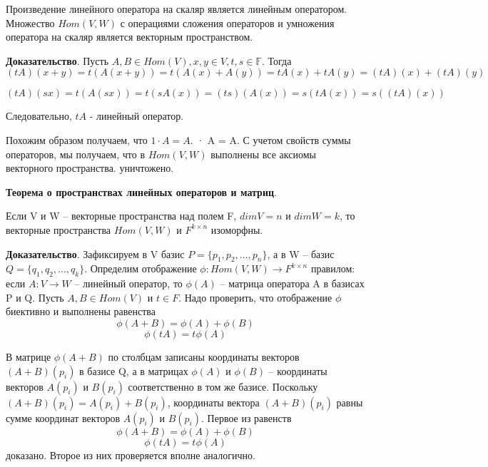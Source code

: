 \documentclass[a4paper]{article}
\begin{document}
Произведение линейного оператора на скаляр является линейным
оператором. Множество $Hom(V, W)$ с операциями сложения операторов
и умножения оператора на скаляр является векторным пространством.

\textbf{Доказательство}. Пусть $A,B \in Hom(V), x,y \in V, t, s \in \mathbb{F}$. Тогда
\begin{equation}
(tA)(x+y) = t(A(x+y)) = t(A(x) + A(y)) = tA(x) + tA(y) = (tA)(x) + (tA)(y)
\end{equation}

\begin{equation}
(tA)(sx) = t(A(sx)) = t(sA(x)) = (ts)(A(x)) = s(tA(x)) = s((tA)(x))
\end{equation}

Следовательно, $tA$ - линейный оператор.

Похожим образом получаем, что $1 \cdot A = A$. · A = A. С учетом свойств суммы операторов, мы получаем,
что в $Hom(V, W)$ выполнены все аксиомы векторного пространства. уничтожено.

\textbf{Теорема о пространствах линейных операторов и матриц}.

Если V и W – векторные пространства над полем F, $dim V = n$ и
$dim W = k$, то векторные пространства $Hom(V,W)$ и $F^{k\times n}$ изоморфны.

\textbf{Доказательство}. Зафиксируем в V базис $P = \{ p_1, p_2, . . . , p_n \}$, а в W –
базис $Q = \{ q_1, q_2, . . . , q_k \}$. Определим отображение
$\phi: Hom(V, W) \rightarrow F^{k \times n}$
правилом: если $A: V \rightarrow W$ – линейный оператор,
то $\phi(A)$ – матрица оператора A в базисах P и Q. Пусть $A, B \in Hom(V)$ и
$t \in F$. Надо проверить, что отображение $\phi$ биективно и выполнены равенства \begin{equation}
\phi (A+B) = \phi(A) + \phi(B)
\end{equation}
\begin{equation}
\phi(tA) = t \phi(A)
\end{equation}

В матрице $\phi(A+B)$ по столбцам записаны координаты векторов
$(A + B)(p_i)$ в базисе Q, а в матрицах $\phi(A)$ и $\phi(B)$ – координаты векторов
$A(p_i)$ и $B(p_i)$ соответственно в том же базисе. Поскольку
$(A + B)(p_i) = A(p_i) + B(p_i)$, координаты вектора $(A + B)(p_i)$ равны
сумме координат векторов $A(p_i)$ и $B(p_i)$. Первое из равенств \begin{equation}
\phi (A+B) = \phi(A) + \phi(B)
\end{equation}
\begin{equation}
\phi(tA) = t \phi(A)
\end{equation}
доказано. Второе из них проверяется вполне аналогично.
\end{document}

